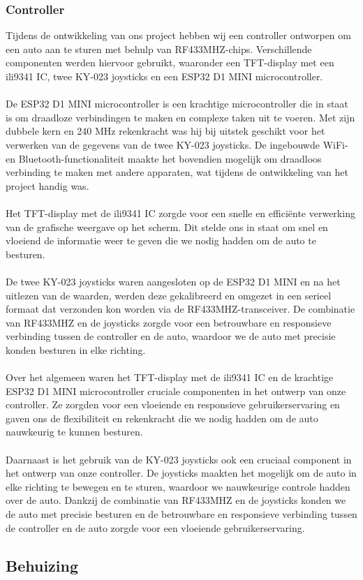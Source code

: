 \subsubsection{Controller}
Tijdens de ontwikkeling van ons project hebben wij een controller ontworpen om een auto aan te sturen met behulp van RF433MHZ-chips. Verschillende componenten werden hiervoor gebruikt, waaronder een TFT-display met een ili9341 IC, twee KY-023 joysticks en een ESP32 D1 MINI microcontroller.\\\\
De ESP32 D1 MINI microcontroller is een krachtige microcontroller die in staat is om draadloze verbindingen te maken en complexe taken uit te voeren. Met zijn dubbele kern en 240 MHz rekenkracht was hij bij uitstek geschikt voor het verwerken van de gegevens van de twee KY-023 joysticks. De ingebouwde WiFi- en Bluetooth-functionaliteit maakte het bovendien mogelijk om draadloos verbinding te maken met andere apparaten, wat tijdens de ontwikkeling van het project handig was.\\\\
Het TFT-display met de ili9341 IC zorgde voor een snelle en efficiënte verwerking van de grafische weergave op het scherm. Dit stelde ons in staat om snel en vloeiend de informatie weer te geven die we nodig hadden om de auto te besturen.\\\\
De twee KY-023 joysticks waren aangesloten op de ESP32 D1 MINI en na het uitlezen van de waarden, werden deze gekalibreerd en omgezet in een serieel formaat dat verzonden kon worden via de RF433MHZ-transceiver. De combinatie van RF433MHZ en de joysticks zorgde voor een betrouwbare en responsieve verbinding tussen de controller en de auto, waardoor we de auto met precisie konden besturen in elke richting.\\\\
Over het algemeen waren het TFT-display met de ili9341 IC en de krachtige ESP32 D1 MINI microcontroller cruciale componenten in het ontwerp van onze controller. Ze zorgden voor een vloeiende en responsieve gebruikerservaring en gaven ons de flexibiliteit en rekenkracht die we nodig hadden om de auto nauwkeurig te kunnen besturen.\\\\
Daarnaast is het gebruik van de KY-023 joysticks ook een cruciaal component in het ontwerp van onze controller. De joysticks maakten het mogelijk om de auto in elke richting te bewegen en te sturen, waardoor we nauwkeurige controle hadden over de auto. Dankzij de combinatie van RF433MHZ en de joysticks konden we de auto met precisie besturen en de betrouwbare en responsieve verbinding tussen de controller en de auto zorgde voor een vloeiende gebruikerservaring.
\subsection{Behuizing}